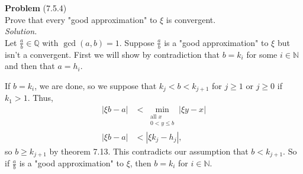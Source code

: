 \documentclass[12 pt]{amsart}
\begin{document}
\noindent
\textbf{Problem} (7.5.4) \\[4ex]
  Prove that every "good approximation" to $\xi$ is convergent.
  \\[2ex]
\emph{Solution.} \\[2ex]
  Let $\frac{a}{b} \in \mathbb{Q}$ with $\gcd(a,b) = 1$.
  Suppose $\frac{a}{b}$ is a "good approximation" to $\xi$
  but isn't a convergent. 
  First we will show by contradiction that $b = k_i$ for some 
  $i \in \mathbb{N}$
  and then that $a = h_i$.

  If $b = k_i$, we are done, so we suppose that 
  $k_j < b < k_{j+1}$ 
  for $j \geq 1$ or $j \geq 0$ if $k_1 > 1$.
  Thus, 
  \begin{align*}
    | \xi b - a| 
    &< 
      \min_{\substack{\text{all $x$}\\0 < y \leq b}}
      | \xi y - x| \\
    | \xi b - a| 
    &< 
      | \xi k_j - h_j|,
  \end{align*}
  so $b \geq k_{j+1}$ by theorem 7.13.
  This contradicts our assumption that $b < k_{j+1}$.
  So if $\frac{a}{b}$ is a "good approximation" to $\xi$, 
  then $b = k_i$ 
  for $i \in \mathbb{N}$.
\end{document}
